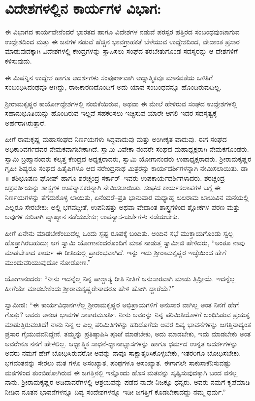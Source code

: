 \section{ವಿದೇಶಗಳಲ್ಲಿನ ಕಾರ್ಯಗಳ ವಿಭಾಗ:}

ಈ ವಿಭಾಗದ ಕಾರ್ಯವೇನೆಂದರೆ ಭಾರತದ ಹಾಗೂ ವಿದೇಶಗಳ ನಡುವೆ ಪರಸ್ಪರ ಹತ್ತಿರದ ಸಂಬಂಧವುಂಟಾಗುವ ಉದ್ದೇಶದಿಂದ ಮತ್ತು ಈ ಜನಗಳ ನಡುವೆ ಹೆಚ್ಚಿನ ಭಾವಗ್ರಾಹಕತೆ ಬೆಳೆಯುವ ಉದ್ದೇಶದಿಂದ, ವೇದಾಂತ ಪ್ರಸಾರ ಮಾಡುವುದಕ್ಕಾಗಿ ವಿದೇಶಗಳಲ್ಲಿ ಕೇಂದ್ರಗಳನ್ನು ಸ್ಥಾಪಿಸಲು ಸಂಘದ ತರಬೇತುಗೊಂಡ ಸದಸ್ಯರನ್ನು ಆ ದೇಶಗಳಿಗೆ ಕಳಿಸುವುದು.

ಈ ಮಿಷನ್ನಿನ ಉದ್ದೇಶ ಹಾಗೂ ಆದರ್ಶಗಳು ಸಂಪೂರ್ಣವಾಗಿ ಆಧ್ಯಾತ್ಮಿಕವೂ ಮಾನವತೆಯ ಒಳಿತಿಗೆ ಸಂಬಂಧಿಸಿದಂಥವೂ ಆಗಿದ್ದು, ರಾಜಕಾರಣದೊಂದಿಗೆ ಅದು ಯಾವ ಸಂಬಂಧವನ್ನೂ ಹೊಂದಿರುವುದಿಲ್ಲ.

ಶ್ರೀರಾಮಕೃಷ್ಣರ ಕಾರ್ಯೋದ್ದೇಶಗಳಲ್ಲಿ ನಂಬಿಕೆಯಿರುವ, ಅಥವಾ ಈ ಮೇಲೆ ಹೇಳಿರುವ ಸಂಘದ ಉದ್ದೇಶಗಳಲ್ಲಿ ಸಹಾನುಭೂತಿಯನ್ನು ಹೊಂದಿರುವ ಇಲ್ಲವೆ ಸಹಕರಿಸಲು ಇಚ್ಛಿಸುವ ಯಾರೇ ಆಗಲಿ ಇದರ ಸದಸ್ಯತ್ವಕ್ಕೆ ಅರ್ಹರಾಗಿರುತ್ತಾರೆ.

ಹೀಗೆ ರಾಮಕೃಷ್ಣ ಮಹಾಸಂಘದ ನಿರ್ಣಯಗಳು ಸಿದ್ಧವಾದುವು ಮತ್ತು ಅಂಗೀಕೃತ ವಾದುವು. ಈಗ ಸಂಘದ ಅಧಿಕಾರಿವರ್ಗದವರ ನೇಮಕವಾಗಬೇಕಾಗಿದೆ. ಸ್ವಾಮಿ ವಿವೇಕಾ ನಂದರೇ ಸಂಘದ ಮಹಾಧ್ಯಕ್ಷರಾಗಿ ನೇಮಕಗೊಂಡರು. ಸ್ವಾಮಿ ಬ್ರಹ್ಮಾನಂದರು ಕಲ್ಕತ್ತ ಕೇಂದ್ರದ ಅಧ್ಯಕ್ಷರಾದರು, ಸ್ವಾಮಿ ಯೋಗಾನಂದರು ಉಪಾಧ್ಯಕ್ಷರಾದರು. ಶ್ರೀರಾಮಕೃಷ್ಣರ ಗೃಹೀ ಶಿಷ್ಯರೂ ಸಂಘದ ಹಿತೈಷಿಗಳೂ ಆದ ನರೇಂದ್ರನಾಥ ಮಿತ್ರರನ್ನು ಕಾರ್ಯದರ್ಶಿಗಳನ್ನಾಗಿ ನೇಮಿಸಲಾಯಿತು. ಡಾ ॥ ಶಶಿಭೂಷಣ ಘೋಷ್ ಹಾಗೂ ಶರಚ್ಚಂದ್ರ ಸರ್ಕಾರ್​–ಇವರು ಉಪಕಾರ್ಯದರ್ಶಿಗಳಾದರು. ಶರಚ್ಚಂದ್ರ ಚಕ್ರವರ್ತಿಯನ್ನು ಶಾಸ್ತ್ರಗಳ ಉಪನ್ಯಾಸಕರನ್ನಾಗಿ ನೇಮಿಸಲಾಯಿತು. ಸಂಘದ ಕಾರ್ಯಕಲಾಪಗಳ ಬಗ್ಗೆ ಈ ನಿರ್ಣಯಗಳನ್ನು ತೆಗೆದುಕೊಳ್ಳ ಲಾಯಿತು, ಏನೆಂದರೆ–ಪ್ರತಿ ಭಾನುವಾರ ಮಧ್ಯಾಹ್ನ ಬಲರಾಮ ಬಾಬುವಿನ ಮನೆಯಲ್ಲಿ ಎಲ್ಲರೂ ಸೇರಬೇಕು; ಅಲ್ಲಿ ಭಗವದ್ಗೀತೆ, ಉಪನಿಷತ್ತು ಅಥವಾ ವೇದಾಂತ ಶಾಸ್ತ್ರಗಳಿಂದ ಶ್ಲೋಕಗಳ ಪಠಣ ಮತ್ತು ಅವುಗಳ ಕುರಿತಾಗಿ ವ್ಯಾಖ್ಯಾನ ನಡೆಯಬೇಕು; ಉಪನ್ಯಾಸ-ಚರ್ಚೆಗಳು ನಡೆಯಬೇಕು.

ಹೀಗೆ ಏನೇನು ಮಾಡಬೇಕೆಂಬುದೆಲ್ಲ ಒಂದು ಸ್ಪಷ್ಟ ರೂಪಕ್ಕೆ ಬಂದಿತು. ಅಂದಿನ ಸಭೆ ಮುಕ್ತಾಯಗೊಂಡು ಸ್ವಲ್ಪ ಹೊತ್ತಾಗಿರಬಹುದು; ಆಗ ಸ್ವಾಮಿ ಯೋಗಾನಂದರೊಂದಿಗೆ ಮಾತ ನಾಡುತ್ತ ಸ್ವಾಮೀಜಿ ಹೇಳಿದರು, “ಅಂತೂ ನಾವು ಮಾಡಬೇಕಾದ ಕಾರ್ಯ ಈ ರೀತಿಯಲ್ಲಿ ಪ್ರಾರಂಭವಾಗಿದೆ. ಇನ್ನು ಇದು ಶ್ರೀರಾಮಕೃಷ್ಣರ ಇಚ್ಛೆಯಿಂದ ಹೇಗೆ ಮುಂದುವರಿಯುವುದೋ ನೋಡೋಣ.”

ಯೋಗಾನಂದರು: “ನೀನು ಇದನ್ನೆಲ್ಲ ನಿನ್ನ ಪಾಶ್ಚಾತ್ಯ ರೀತಿ ನೀತಿಗೆ ಅನುಸಾರವಾಗಿ ಮಾಡು ತ್ತಿದ್ದೀಯೆ. ಇದನ್ನೆಲ್ಲ ಹೀಗೆಯೇ ಮಾಡಬೇಕೆಂದು ಶ್ರೀರಾಮಕೃಷ್ಣರೇನಾದರೂ ಹೇಳಿ ಹೋಗಿ ದ್ದಾರೆಯೆ?”

ಸ್ವಾಮೀಜಿ: “ಈ ಕಾರ್ಯವಿಧಾನಗಳೆಲ್ಲ ಶ್ರೀರಾಮಕೃಷ್ಣರ ಅಭಿಪ್ರಾಯಗಳಿಗೆ ಅನುಸಾರ ವಾಗಿಲ್ಲ ಅಂತ ನಿನಗೆ ಹೇಗೆ ಗೊತ್ತು? ಅವರು ಅನಂತ ಭಾವಗಳ ಸಾಕಾರಮೂರ್ತಿ. ನೀನು ಅವರನ್ನು ನಿನ್ನ ಪರಿಮಿತಿಯೊಳಗೆ ಬಂಧಿಸಿಡುವ ಪ್ರಯತ್ನ ಮಾಡುತ್ತಿರುವಂತಿದೆ! ನಾನು ನಿನ್ನ ಆ ಎಲ್ಲ ಪರಿಮಿತಿಗಳನ್ನು ಹರಿದೊಗೆದು ಅವರ ದಿವ್ಯ ಭಾವನೆಗಳನ್ನು ಜಗತ್ತಿನಾದ್ಯಂತ ಪ್ರಸಾರ ಗೈಯುವವನಿದ್ದೇನೆ. ತಮ್ಮನ್ನು ಪ್ರತಿಷ್ಠಾಪಿಸಿ ಪೂಜೆ ಮಾಡಬೇಕು, ಅದು ಮಾಡಬೇಕು, ಇದು ಮಾಡಬೇಕು ಅಂತ ಅವರೇನೂ ನನಗೆ ಹೇಳಲಿಲ್ಲ. ಆಧ್ಯಾತ್ಮಿಕ ಸಾಧನೆ-ಧ್ಯಾನಾಭ್ಯಾಸಗಳನ್ನು ಹಾಗೂ ಧರ್ಮದ ಉನ್ನತ ಆದರ್ಶಗಳನ್ನು ಅವರು ನಮಗೆ ಹೇಗೆ ಬೋಧಿಸಿರುವರೋ ಅವನ್ನು ನಾವೂ ಸಾಕ್ಷಾತ್ಕರಿಸಿಕೊಳ್ಳಬೇಕು, ಇತರರಿಗೂ ಬೋಧಿಸಬೇಕು. ಭಗವಂತನನ್ನು ಸೇರಲು ಮತ ಗಳೂ ಅಸಂಖ್ಯಾತ, ಪಂಥಗಳೂ ಅಸಂಖ್ಯಾತ. ಈಗಾಗಲೇ ಸಾಕುಸಾಕೆನಿಸುವಷ್ಟು ಮತಗಳಿಂದ ತುಂಬಿಹೋಗಿರುವ ಈ ಜಗತ್ತಿನಲ್ಲಿ ಇನ್ನೊಂದು ಹೊಸ ಮತವನ್ನು ಸೃಷ್ಟಿಸುವುದಕ್ಕಾಗಿ ಬಂದ ವನಲ್ಲ ನಾನು. ಶ್ರೀರಾಮಕೃಷ್ಣರ ಅಡಿದಾವರೆಗಳಲ್ಲಿ ಆಶ್ರಯವನ್ನು ಪಡೆದ ನಾವೇ ನಿಜಕ್ಕೂ ಧನ್ಯರು. ಅವರು ನಮಗೆ ಕೃಪೆಮಾಡಿ ನೀಡಿದ ನೂತನ ಭಾವನೆಗಳನ್ನೂ ದಿವ್ಯ ಸಂದೇಶಗಳನ್ನೂ ಇಡೀ ಜಗತ್ತಿಗೆ ಕೊಡಬೇಕಾದದ್ದು ನಮ್ಮ ಧರ್ಮ.”

